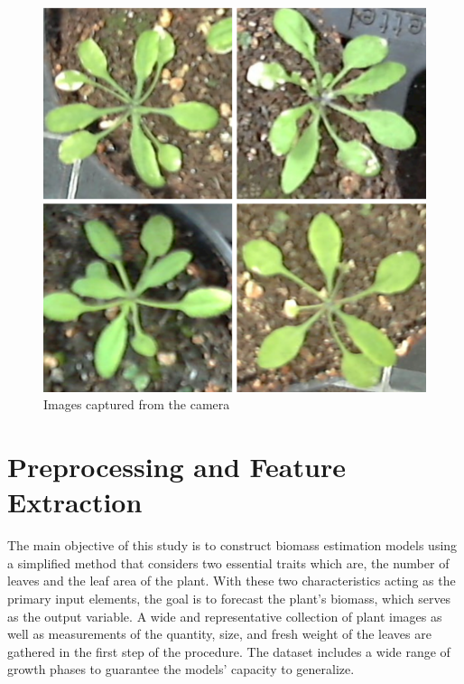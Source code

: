 \documentclass[a4paper,12pt]{report}%
\renewcommand{\\}{\vspace*{0.5\baselineskip} \newline}
\begin{document}
\begin{figure}[h]
\centering
	\includegraphics[scale=1.0]{images/images from camera.png}\\
	\begin{footnotesize}
		\caption{Images captured from the camera}
		\label{Images captured from the camera}
	\end{footnotesize}
\end{figure}


\section{Preprocessing and  Feature Extraction}
The main objective of this study is to construct biomass estimation models using a simplified method that considers two essential traits which are, the number of leaves and the leaf area of the plant. With these two characteristics acting as the primary input elements, the goal is to forecast the plant's biomass, which serves as the output variable. A wide and representative collection of plant images as well as measurements of the quantity, size, and fresh weight of the leaves are gathered in the first step of the procedure. The dataset includes a wide range of growth phases to guarantee the models' capacity to generalize.
\end{document}
